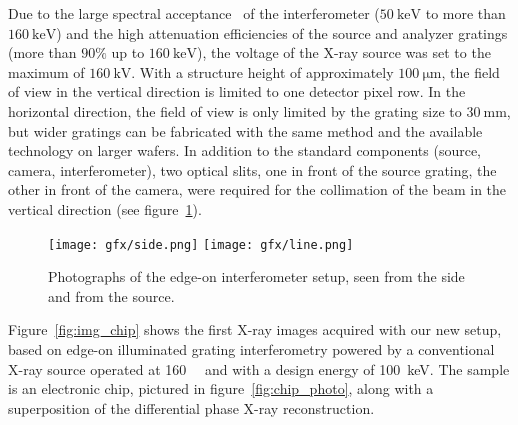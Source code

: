 Due to the large spectral acceptance~\cite{Weitkamp2005,Thuering2013c} of the
interferometer ($\SI{50}{\kilo\electronvolt}$ to
more than $\SI{160}{\kilo\electronvolt}$) and the high attenuation efficiencies of
the source and analyzer gratings (more than $90\%$ up to
$\SI{160}{\kilo\electronvolt}$), the voltage of the X-ray source was set to
the maximum of $\SI{160}{\kilo\volt}$. With a structure height of
approximately $\SI{100}{\micro\metre}$, the field of view in the vertical
direction is limited to one detector pixel row. In the horizontal direction,
the field of view is only limited by the grating size to
$\SI{30}{\milli\metre}$, but wider gratings can be fabricated with the same
method and the available technology on larger wafers. In addition to the standard components (source,
camera, interferometer), two optical slits, one in front of the source
grating, the other in front of the camera, were required for the collimation
of the beam in the vertical direction (see figure~\ref{fig:edge.on.photos}). 

\begin{figure}[ht]
    \centering
    \texttt{[image: gfx/side.png]}
    \texttt{[image: gfx/line.png]}
    \caption{Photographs of the edge-on interferometer setup, seen
    from the side and from the source.}\label{fig:edge.on.photos}
\end{figure}

Figure~\ref{fig:img_chip} shows the first X-ray images acquired with our new setup, based on
edge-on illuminated grating interferometry powered by a conventional X-ray
source operated at \SI{160}{\kilo\voltpeak} and with a design energy of
\SI{100}{\kilo\eV}. The sample is an electronic chip, pictured in
figure~\ref{fig:chip_photo}, along with a superposition of the differential
phase X-ray reconstruction.

